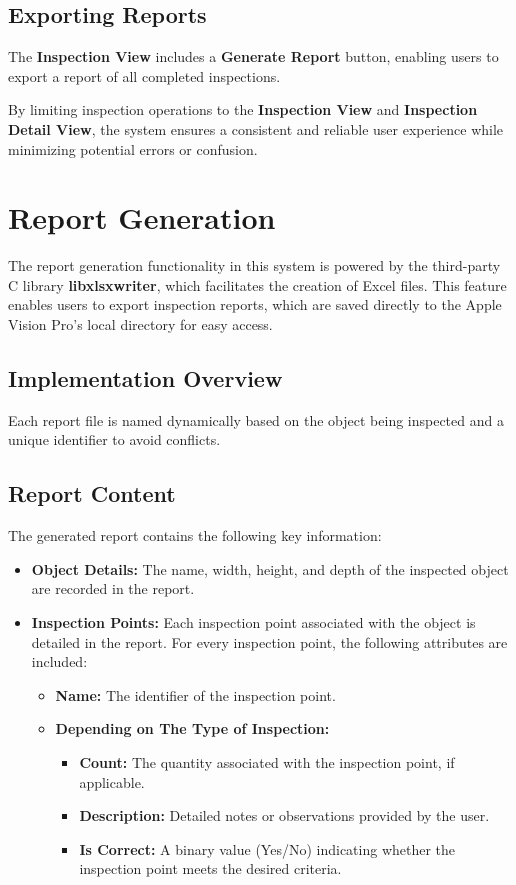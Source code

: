 \subsection{Exporting Reports}
The \textbf{Inspection View} includes a \textbf{Generate Report} button, enabling users to export a report of all completed inspections.

By limiting inspection operations to the \textbf{Inspection View} and \textbf{Inspection Detail View}, the system ensures a consistent and reliable user experience while minimizing potential errors or confusion.


\section{Report Generation}

The report generation functionality in this system is powered by the third-party C library \textbf{libxlsxwriter}, which facilitates the creation of Excel files. This feature enables users to export inspection reports, which are saved directly to the Apple Vision Pro's local directory for easy access.

\subsection{Implementation Overview}
Each report file is named dynamically based on the object being inspected and a unique identifier to avoid conflicts.

\subsection{Report Content}
The generated report contains the following key information:
\begin{itemize}
    \item \textbf{Object Details:} The name, width, height, and depth of the inspected object are recorded in the report.
    \item \textbf{Inspection Points:} Each inspection point associated with the object is detailed in the report. For every inspection point, the following attributes are included:
    \begin{itemize}
        \item \textbf{Name:} The identifier of the inspection point.
        \item \textbf{Depending on The Type of Inspection:}
        \begin{itemize}
            \item \textbf{Count:} The quantity associated with the inspection point, if applicable.
            \item \textbf{Description:} Detailed notes or observations provided by the user.
            \item \textbf{Is Correct:} A binary value (Yes/No) indicating whether the inspection point meets the desired criteria.
        \end{itemize}
    \end{itemize}
\end{itemize}

